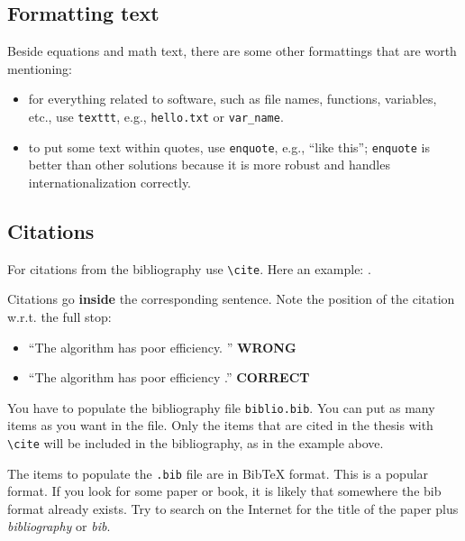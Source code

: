 \subsection{Formatting text}

Beside equations and math text, there are some other formattings that are worth mentioning:

\begin{itemize}
\item for everything related to software, such as file names, functions, variables, etc., use \texttt{texttt}, e.g., \texttt{hello.txt} or \texttt{var\_name}.
\item to put some text within quotes, use \texttt{enquote}, e.g., \enquote{like this}; \texttt{enquote} is better than other solutions because it is more robust and handles internationalization correctly.
\end{itemize}

\subsection{Citations}

For citations from the bibliography use \texttt{\textbackslash cite}.
Here an example: \cite{example-citation}.

Citations go \textbf{inside} the corresponding sentence.
Note the position of the citation w.r.t. the full stop:

\begin{itemize}
\item \enquote{The algorithm has poor efficiency. \cite{example-citation}} \textbf{WRONG}
\item \enquote{The algorithm has poor efficiency \cite{example-citation}.} \textbf{CORRECT}
\end{itemize}

You have to populate the bibliography file \texttt{biblio.bib}.
You can put as many items as you want in the file.
Only the items that are cited in the thesis with \texttt{\textbackslash cite} will be included in the bibliography, as in the example above.

The items to populate the \texttt{.bib} file are in BibTeX format.
This is a popular format.
If you look for some paper or book, it is likely that somewhere the bib format already exists.
Try to search on the Internet for the title of the paper plus \textit{bibliography} or \textit{bib}.

